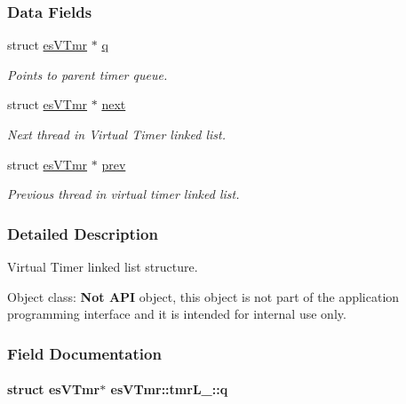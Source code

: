 \subsubsection*{Data Fields}
\begin{DoxyCompactItemize}
\item 
struct \hyperlink{structesVTmr}{es\-V\-Tmr} $\ast$ \hyperlink{structesVTmr_1_1tmrL___ac94cbec591cfa91217281a5a5eb58a18}{q}
\begin{DoxyCompactList}\small\item\em Points to parent timer queue. \end{DoxyCompactList}\item 
struct \hyperlink{structesVTmr}{es\-V\-Tmr} $\ast$ \hyperlink{structesVTmr_1_1tmrL___aecec9d50fcf431357a3d03428a56f97c}{next}
\begin{DoxyCompactList}\small\item\em Next thread in Virtual Timer linked list. \end{DoxyCompactList}\item 
struct \hyperlink{structesVTmr}{es\-V\-Tmr} $\ast$ \hyperlink{structesVTmr_1_1tmrL___af796db79ea86f16a9c976f0546e0dee5}{prev}
\begin{DoxyCompactList}\small\item\em Previous thread in virtual timer linked list. \end{DoxyCompactList}\end{DoxyCompactItemize}


\subsubsection{Detailed Description}
Virtual Timer linked list structure. 

\begin{DoxyParagraph}{Object class\-:}
{\bfseries Not A\-P\-I} object, this object is not part of the application programming interface and it is intended for internal use only. 
\end{DoxyParagraph}


\subsubsection{Field Documentation}
\hypertarget{structesVTmr_1_1tmrL___ac94cbec591cfa91217281a5a5eb58a18}{
\paragraph[{q}]{\setlength{\rightskip}{0pt plus 5cm}struct {\bf es\-V\-Tmr}$\ast$ es\-V\-Tmr\-::tmr\-L\-\_\-\-::q}}\label{structesVTmr_1_1tmrL___ac94cbec591cfa91217281a5a5eb58a18}


